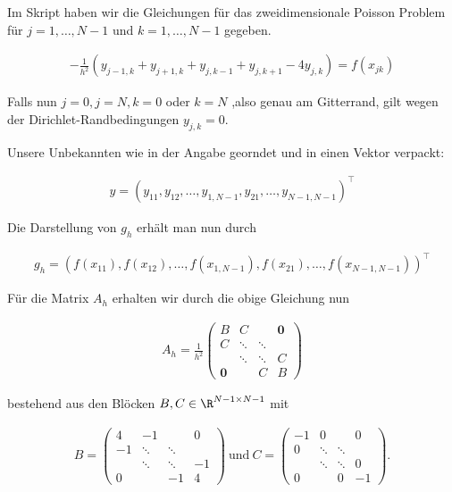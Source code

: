 \begin{solution}
  Im Skript haben wir die Gleichungen für das zweidimensionale Poisson Problem
  für $j = 1,\dots, N-1$ und $k = 1,\dots, N-1$ gegeben.

  \begin{align*}
    -\frac{1}{h^2}(y_{j-1,k} + y_{j+1,k}
    + y_{j,k-1} + y_{j,k+1}
    - 4 y_{j,k})
    =
    f(x_{jk})
  \end{align*}

  Falls nun $j=0, j=N, k = 0$ oder $k=N$ ,also genau am Gitterrand,
  gilt wegen der Dirichlet-Randbedingungen $y_{j,k} = 0$.

  Unsere Unbekannten wie in der Angabe georndet und in einen Vektor verpackt:

  \begin{align*}
    y = (y_{11}, y_{12}, \dots, y_{1,N-1}, y_{21}, \dots, y_{N-1,N-1})^\top
  \end{align*}

  Die Darstellung von $g_h$ erhält man nun durch

  \begin{align*}
    g_h = (f(x_{11}), f(x_{12}), \dots, f(x_{1,N-1}), f(x_{21}), \dots, f(x_{N-1,N-1}))^\top
  \end{align*}

  Für die Matrix $A_h$ erhalten wir durch die obige Gleichung nun

  \begin{align*}
      A_h= \frac{1}{h^2}\left(\begin{array}{cccccc}
                  B & C && \boldsymbol{0} \\
                  C & \ddots & \ddots & \\
                  & \ddots & \ddots & C \\
                  \boldsymbol{0} && C & B
             \end{array}
       \right)
  \end{align*}

  bestehend aus den Blöcken $B,C \in \R^{N-1 \times N-1}$ mit

  \begin{align*}
      B = \left( \begin{array}{cccccc}
                  4 & -1 && 0 \\
                  -1 & \ddots & \ddots & \\
                  & \ddots & \ddots & -1 \\
                  0 && -1 & 4
           \end{array}
          \right)
  \mathrm{~und~}
      C = \left(\begin{array}{cccccc}
                  -1 & 0 && 0 \\
                  0 & \ddots & \ddots & \\
                  & \ddots & \ddots & 0 \\
                  0 && 0 & -1
            \end{array}
          \right).
   \end{align*}


\end{solution}
